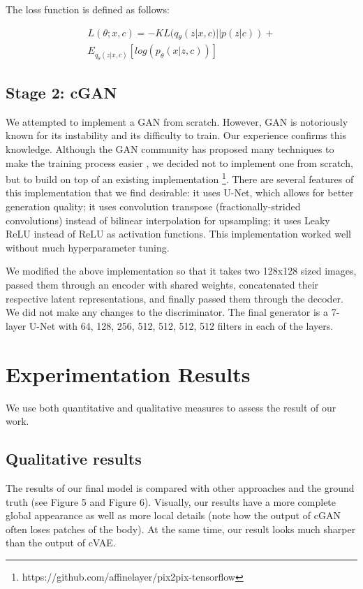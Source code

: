\documentclass[10pt,conference]{IEEEtran}
\begin{document}
The loss function is defined as follows:

\begin{multline}
L(\theta;x, c)= -KL(q_\theta(z|x, c)||p(z|c))+ \\
E_{q_\theta(z|x, c)}[log(p_\theta(x|z, c))]
\end{multline}

\subsection{Stage 2: cGAN}

We attempted to implement a GAN from scratch. However, GAN is notoriously known for its instability and its difficulty to train. Our experience confirms this knowledge. Although the GAN community has proposed many techniques to make the training process easier \autocite{salimans2016improved, arjovsky2017wasserstein, karras2017progressive}, we decided not to implement one from scratch, but to build on top of an existing implementation \footnote{https://github.com/affinelayer/pix2pix-tensorflow}. There are several features of this implementation that we find desirable: it uses U-Net, which allows for better generation quality; it uses convolution transpose (fractionally-strided convolutions) instead of bilinear interpolation for upsampling; it uses Leaky ReLU instead of ReLU as activation functions. This implementation worked well without much hyperparameter tuning.

We modified the above implementation so that it takes two 128x128 sized images, passed them through an encoder with shared weights, concatenated their respective latent representations, and finally passed them through the decoder. We did not make any changes to the discriminator. The final generator is a 7-layer U-Net with 64, 128, 256, 512, 512, 512, 512 filters in each of the layers.

\section{Experimentation Results}

We use both quantitative and qualitative measures to assess the result of our work.

\subsection{Qualitative results}

The results of our final model is compared with other approaches and the ground truth (see Figure 5 and Figure 6). Visually, our results have a more complete global appearance as well as more local details (note how the output of cGAN often loses patches of the body). At the same time, our result looks much sharper than the output of cVAE.
\end{document}
